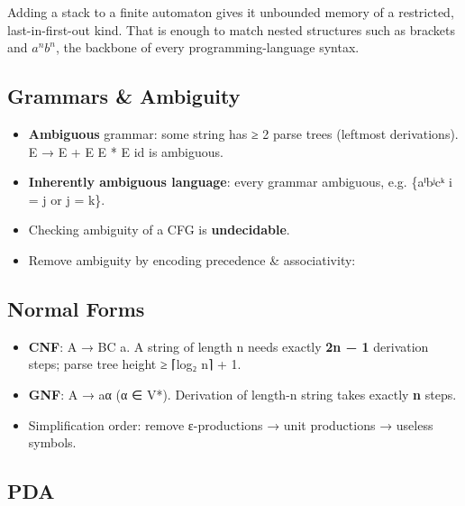 Adding a stack to a finite automaton gives it unbounded memory of a restricted, last-in-first-out kind. That
is enough to match nested structures such as brackets and \(a^n b^n\), the backbone of every programming-language
syntax.

\needspace{95pt}

\hypertarget{p2-08--51-grammars--ambiguity}{%
\subsection{Grammars \& Ambiguity}\label{p2-08--51-grammars--ambiguity}}

\begin{itemize}
\tightlist
\item
  \textbf{Ambiguous} grammar: some string has ≥ 2 parse trees (leftmost derivations). E → E + E \textbar{} E * E \textbar{} id is ambiguous.
\item
  \textbf{Inherently ambiguous language}: every grammar ambiguous, e.g. \{aⁱbʲcᵏ \textbar{} i = j or j = k\}.
\item
  Checking ambiguity of a CFG is \textbf{undecidable}.
\item
  Remove ambiguity by encoding precedence \& associativity:
\end{itemize}



\needspace{95pt}

\hypertarget{p2-08--52-normal-forms}{%
\subsection{Normal Forms}\label{p2-08--52-normal-forms}}

\begin{itemize}
\tightlist
\item
  \textbf{CNF}: A → BC \textbar{} a. A string of length n needs exactly \textbf{2n − 1} derivation steps; parse tree height ≥ ⌈log₂ n⌉ + 1.
\item
  \textbf{GNF}: A → aα (α ∈ V*). Derivation of length-n string takes exactly \textbf{n} steps.
\item
  Simplification order: remove ε-productions → unit productions → useless symbols.
\end{itemize}

\needspace{95pt}

\hypertarget{p2-08--53-pda}{%
\subsection{PDA}\label{p2-08--53-pda}}


